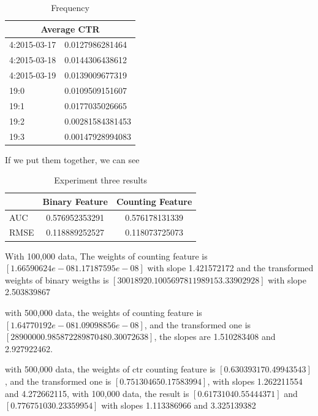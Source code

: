 \documentclass{article}
\begin{document}
\begin{table}[h]
\setlength{\parindent}{17ex}
\begin{tabular}{ |p{3cm}||p{3cm}|  }
 \hline
 \multicolumn{2}{|c|}{Average CTR} \\
 \hline
    4:2015-03-17 & 0.0127986281464  \\
    4:2015-03-18 & 0.0144306438612 \\
    4:2015-03-19 & 0.0139009677319\\
  19:0 & 0.0109509151607\\
  19:1 & 0.0177035026665\\
  19:2 & 0.00281584381453 \\
  19:3 & 0.00147928994083\\
  
 \hline
\end{tabular}
\caption{Frequency}
\label{tab:tri}
\end{table}\vspace{3mm}

If we put them together, we can see
\begin{table}[h]
\setlength{\parindent}{17ex}
\begin{tabular}{l | c | c }
  & Binary Feature & Counting Feature\\
\hline \hline
AUC & 0.576952353291
 & 0.576178131339 \\
 
RMSE & 0.118889252527 & 0.118073725073


\end{tabular}
\caption{Experiment three results}
\label{tab:tri}
\end{table}


With 100,000 data, The weights of counting feature is  \([1.66590624e-08   1.17187595e-08]\)  with slope 1.421572172 and the transformed weights of binary weigths is 
\([ 30018920.10056978  11989153.33902928]\) with slope 2.503839867

with 500,000 data, the weights of counting feature is \([1.64770192e-08   1.09098856e-08]\), and the transformed one is \([ 28900000.98587228   9870480.30072638]\), the slopes are 1.510283408 and 2.927922462. 


with 500,000 data, the weights of ctr counting feature is \([ 0.63039317  0.49943543]\), and the transformed one is \([ 0.75130465  0.17583994]\), with slopes 1.262211554 and 4.272662115, with 100,000 data, the result is \([ 0.6173104   0.55444371]\) and  \([ 0.77675103  0.23359954]\) with slopes 1.113386966 and 3.325139382
\end{document}
